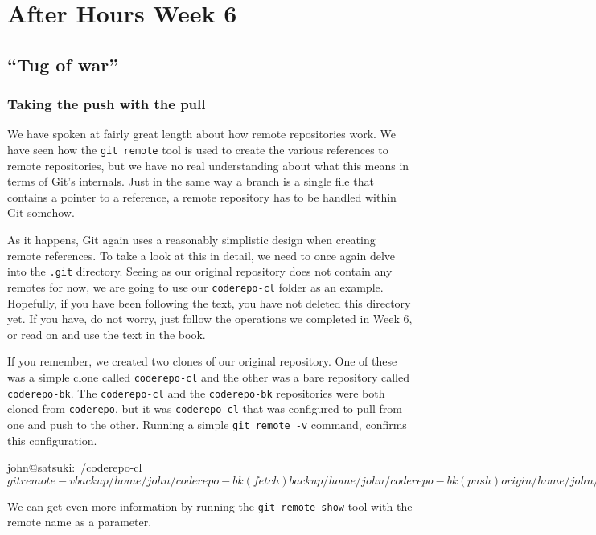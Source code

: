 \chapter{After Hours Week 6}
\section{``Tug of war''}
\subsection{Taking the push with the pull}
We have spoken at fairly great length about how remote repositories work.
We have seen how the \texttt{git remote} tool is used to create the various references to remote repositories, but we have no real understanding about what this means in terms of Git's internals.
Just in the same way a branch is a single file that contains a pointer to a reference, a remote repository has to be handled within Git somehow.

As it happens, Git again uses a reasonably simplistic design when creating remote references.
To take a look at this in detail, we need to once again delve into the \texttt{.git} directory.
Seeing as our original repository does not contain any remotes for now, we are going to use our \texttt{coderepo-cl} folder as an example.
Hopefully, if you have been following the text, you have not deleted this directory yet.
If you have, do not worry, just follow the operations we completed in Week 6, or read on and use the text in the book.

If you remember, we created two clones of our original repository.
One of these was a simple clone called \texttt{coderepo-cl} and the other was a bare repository called \texttt{coderepo-bk}.
The \texttt{coderepo-cl} and the \texttt{coderepo-bk} repositories were both cloned from \texttt{coderepo}, but it was \texttt{coderepo-cl} that was configured to pull from one and push to the other.
Running a simple \texttt{git remote -v} command, confirms this configuration.

\begin{code}
john@satsuki:~/coderepo-cl$ git remote -v
backup	/home/john/coderepo-bk (fetch)
backup	/home/john/coderepo-bk (push)
origin	/home/john/coderepo (fetch)
origin	/home/john/coderepo (push)
john@satsuki:~/coderepo-cl$
\end{code}

We can get even more information by running the \texttt{git remote show} tool with the remote name as a parameter.

